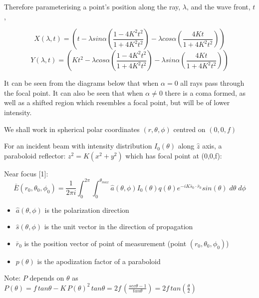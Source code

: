 \documentclass{article}
\begin{document}
    Therefore parameterising a point's position along the ray, \(\lambda\), and the wave front, \(t\),

    \[X(\lambda,t) = \left(t-\lambda sin\alpha \left(\frac{1-4K^2t^2}{1+4K^2t^2}\right) - \lambda cos\alpha \left(\frac{4Kt}{1+4K^2t^2}\right)\right)\]
    \[Y(\lambda,t) = \left(Kt^2-\lambda cos\alpha \left(\frac{1-4K^2t^2}{1+4K^2t^2}\right) - \lambda sin\alpha \left(\frac{4Kt}{1+4K^2t^2}\right)\right)\]

    It can be seen from the diagrams below that when \(\alpha = 0\) all rays pass through the focal point. It can also be seen that when \(\alpha \neq 0\) there is a coma formed, as well as a shifted region which resembles a focal point, but will be of lower intensity.

    We shall work in spherical polar coordinates  \( (r,\theta , \phi) \) centred on \( (0,0,f) \)

    For an incident beam with intensity distribution \(I_0(\theta ) \) along \(\hat{z}\) axis, a paraboloid reflector: \(z^2 = K(x^2+y^2)\) which has focal point at (0,0,f):
    
    Near focus [1]:
    \[ \bar{E}(r_0,\theta_0 ,\phi_0 ) = \frac{1}{2\pi i} \int_0^{2 \pi } \int_0^{\theta_{max}} \hat{a} (\theta , \phi) I_0(\theta) q(\theta) e^{-i K \bar{s}_0 \cdot \bar{r}_0} sin(\theta) \; {d\theta} \; {d\phi} \]
    \begin{itemize}
	\item \( \hat{a}   (\theta , \phi) \) is the polarization direction
	\item \( \hat{s} (\theta , \phi) \) is the unit vector in the direction of propagation
	\item \( \bar{r}_0 \) is the position vector of point of measurement (point \( (r_0, \theta_0 , \phi_0)\))
	\item \( p(\theta) \) is the apodization factor of a paraboloid
    \end{itemize}

    Note: \(P\) depends on \(\theta\) as \( P(\theta) = f \, tan \theta - K \, P(\theta)^2 \, tan \theta = 2f \, \left(\frac{sec \theta - 1}{tan \theta}\right) = 2f \, tan\left(\frac{\theta}{2}\right)\)
\end{document}
